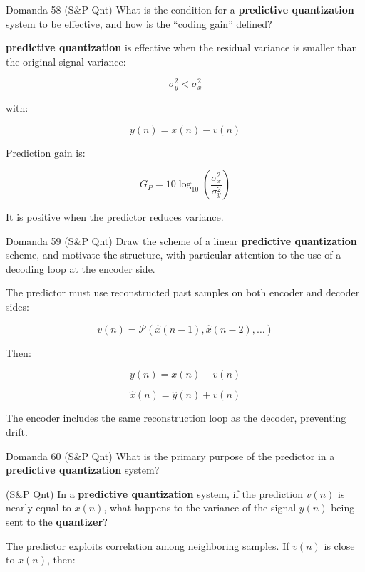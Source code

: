 \begin{questionbox}{Domanda 58}
(S\&P Qnt) What is the condition for a \textbf{predictive \textbf{quantization}} system to be effective, and how is the “coding gain” defined?
\end{questionbox}


\textbf{predictive \textbf{quantization}} is effective when the residual variance is smaller than the original signal variance:


$$
\sigma_y^2 < \sigma_x^2
$$


with:


$$
y(n)=x(n)-v(n)
$$


Prediction gain is:


$$
G_P=10\log_{10}\left(\frac{\sigma_x^2}{\sigma_y^2}\right)
$$


It is positive when the predictor reduces variance.



\begin{questionbox}{Domanda 59}
(S\&P Qnt) Draw the scheme of a linear \textbf{predictive \textbf{quantization}} scheme, and motivate the structure, with particular attention to the use of a decoding loop at the encoder side.
\end{questionbox}


The predictor must use reconstructed past samples on both encoder and decoder sides:


$$
v(n)=\mathcal{P}(\hat{x}(n-1),\hat{x}(n-2),\dots)
$$


Then:


$$
y(n)=x(n)-v(n)
$$



$$
\hat{x}(n)=\hat{y}(n)+v(n)
$$


The encoder includes the same reconstruction loop as the decoder, preventing drift.



\begin{questionbox}{Domanda 60}
(S\&P Qnt) What is the primary purpose of the predictor in a \textbf{predictive \textbf{quantization}} system?

(S\&P Qnt) In a \textbf{predictive \textbf{quantization}} system, if the prediction $v(n)$ is nearly equal to $x(n)$, what happens to the variance of the signal $y(n)$ being sent to the \textbf{quantizer}?
\end{questionbox}


The predictor exploits correlation among neighboring samples. If $v(n)$ is close to $x(n)$, then:


